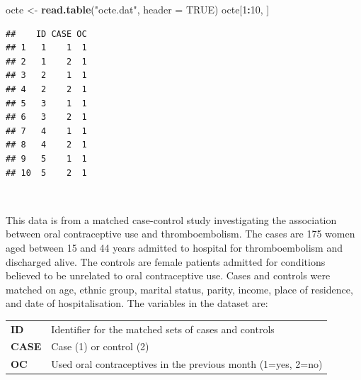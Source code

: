 \documentclass[12pt,a4paper]{book}
\newenvironment{Shaded}{\begin{snugshade}}{\end{snugshade}}
\newcommand{\KeywordTok}[1]{\textcolor[rgb]{0.13,0.29,0.53}{\textbf{#1}}}
\newcommand{\DataTypeTok}[1]{\textcolor[rgb]{0.13,0.29,0.53}{#1}}
\newcommand{\DecValTok}[1]{\textcolor[rgb]{0.00,0.00,0.81}{#1}}
\newcommand{\StringTok}[1]{\textcolor[rgb]{0.31,0.60,0.02}{#1}}
\newcommand{\OtherTok}[1]{\textcolor[rgb]{0.56,0.35,0.01}{#1}}
\newcommand{\OperatorTok}[1]{\textcolor[rgb]{0.81,0.36,0.00}{\textbf{#1}}}
\newcommand{\NormalTok}[1]{#1}
\theoremstyle{definition}
\theoremstyle{definition}
\theoremstyle{definition}
\theoremstyle{remark}
\begin{document}
\begin{Shaded}
\begin{Highlighting}[]
\NormalTok{octe <-}\StringTok{ }\KeywordTok{read.table}\NormalTok{(}\StringTok{"octe.dat"}\NormalTok{, }\DataTypeTok{header =} \OtherTok{TRUE}\NormalTok{)}
\NormalTok{octe[}\DecValTok{1}\OperatorTok{:}\DecValTok{10}\NormalTok{, ]}
\end{Highlighting}
\end{Shaded}

\begin{verbatim}
##    ID CASE OC
## 1   1    1  1
## 2   1    2  1
## 3   2    1  1
## 4   2    2  1
## 5   3    1  1
## 6   3    2  1
## 7   4    1  1
## 8   4    2  1
## 9   5    1  1
## 10  5    2  1
\end{verbatim}

~

This data is from a matched case-control study investigating the
association between oral contraceptive use and thromboembolism. The
cases are 175 women aged between 15 and 44 years admitted to hospital
for thromboembolism and discharged alive. The controls are female
patients admitted for conditions believed to be unrelated to oral
contraceptive use. Cases and controls were matched on age, ethnic group,
marital status, parity, income, place of residence, and date of
hospitalisation. The variables in the dataset are:

\newpage

\begin{longtable}[]{@{}ll@{}}
\toprule
\begin{minipage}[t]{0.19\columnwidth}\raggedright
\textbf{ID}\strut
\end{minipage} & \begin{minipage}[t]{0.75\columnwidth}\raggedright
Identifier for the matched sets of cases and controls\strut
\end{minipage}\tabularnewline
\begin{minipage}[t]{0.19\columnwidth}\raggedright
\textbf{CASE}\strut
\end{minipage} & \begin{minipage}[t]{0.75\columnwidth}\raggedright
Case (1) or control (2)\strut
\end{minipage}\tabularnewline
\begin{minipage}[t]{0.19\columnwidth}\raggedright
\textbf{OC}\strut
\end{minipage} & \begin{minipage}[t]{0.75\columnwidth}\raggedright
Used oral contraceptives in the previous month (1=yes, 2=no)\strut
\end{minipage}\tabularnewline
\bottomrule
\end{longtable}
\end{document}
